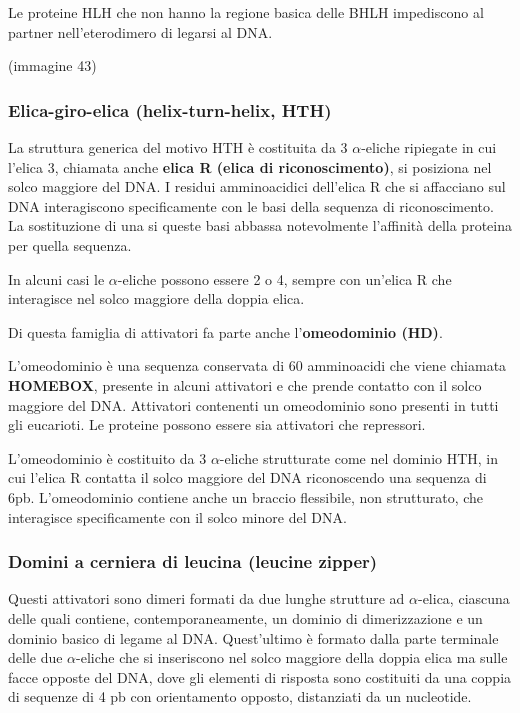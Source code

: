 \documentclass[]{article}
\begin{document}
Le proteine HLH che non hanno la regione basica delle BHLH impediscono
al partner nell'eterodimero di legarsi al DNA.

(immagine 43)

\subsubsection{Elica-giro-elica (helix-turn-helix,
HTH)}\label{elica-giro-elica-helix-turn-helix-hth}

La struttura generica del motivo HTH è costituita da 3 \(\alpha\)-eliche
ripiegate in cui l'elica 3, chiamata anche \textbf{elica R (elica di
riconoscimento)}, si posiziona nel solco maggiore del DNA. I residui
amminoacidici dell'elica R che si affacciano sul DNA interagiscono
specificamente con le basi della sequenza di riconoscimento. La
sostituzione di una si queste basi abbassa notevolmente l'affinità della
proteina per quella sequenza.

In alcuni casi le \(\alpha\)-eliche possono essere 2 o 4, sempre con
un'elica R che interagisce nel solco maggiore della doppia elica.

Di questa famiglia di attivatori fa parte anche l'\textbf{omeodominio
(HD)}.

L'omeodominio è una sequenza conservata di 60 amminoacidi che viene
chiamata \textbf{HOMEBOX}, presente in alcuni attivatori e che prende
contatto con il solco maggiore del DNA. Attivatori contenenti un
omeodominio sono presenti in tutti gli eucarioti. Le proteine possono
essere sia attivatori che repressori.

L'omeodominio è costituito da 3 \(\alpha\)-eliche strutturate come nel
dominio HTH, in cui l'elica R contatta il solco maggiore del DNA
riconoscendo una sequenza di 6pb. L'omeodominio contiene anche un
braccio flessibile, non strutturato, che interagisce specificamente con
il solco minore del DNA.

\subsubsection{Domini a cerniera di leucina (leucine
zipper)}\label{domini-a-cerniera-di-leucina-leucine-zipper}

Questi attivatori sono dimeri formati da due lunghe strutture ad
\(\alpha\)-elica, ciascuna delle quali contiene, contemporaneamente, un
dominio di dimerizzazione e un dominio basico di legame al DNA.
Quest'ultimo è formato dalla parte terminale delle due \(\alpha\)-eliche
che si inseriscono nel solco maggiore della doppia elica ma sulle facce
opposte del DNA, dove gli elementi di risposta sono costituiti da una
coppia di sequenze di 4 pb con orientamento opposto, distanziati da un
nucleotide.
\end{document}
